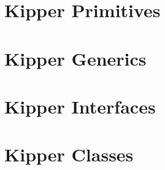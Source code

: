 \section{Kipper Primitives}
\label{sec:kipper-primitives}

\section{Kipper Generics}
\label{sec:kipper-generics}

\section{Kipper Interfaces}
\label{sec:kipper-interfaces}

\section{Kipper Classes}
\label{sec:kipper-classes}

